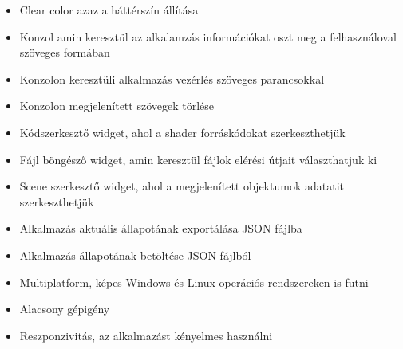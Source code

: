 \begin{itemize}
    \item Clear color azaz a háttérszín állítása
    \item Konzol amin keresztül az alkalamzás információkat oszt meg a felhasználoval szöveges formában
    \item Konzolon keresztüli alkalmazás vezérlés szöveges parancsokkal
    \item Konzolon megjelenített szövegek törlése
    \item Kódszerkesztő widget, ahol a shader forráskódokat szerkeszthetjük
    \item Fájl böngésző widget, amin keresztül fájlok elérési útjait választhatjuk ki
    \item Scene szerkesztő widget, ahol a megjelenített objektumok adatatit szerkeszthetjük
    \item Alkalmazás aktuális állapotának exportálása JSON fájlba
    \item Alkalmazás állapotának betöltése JSON fájlból
    \item Multiplatform, képes Windows és Linux operációs  rendszereken is futni
    \item Alacsony gépigény
    \item Reszponzivitás, az alkalmazást kényelmes használni
\end{itemize}

